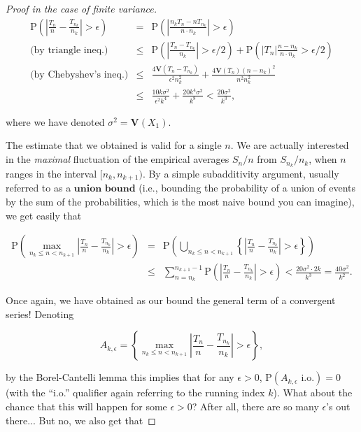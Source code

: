 \begin{proof}[Proof in the case of finite variance]
\begin{eqnarray*}
\mathrm{P}\left( \left| \frac{T_n}{n}-\frac{T_{n_k}}{n_k} \right| > \epsilon \right) &=& \mathrm{P}\left( \left|
\frac{n_k T_n - n T_{n_k}}{n\cdot n_k} \right|>\epsilon\right) \\
\textrm{(by triangle ineq.)}  &\le&
\mathrm{P}\left( \left| \frac{T_n -T_{n_k}}{n_k} \right| > \epsilon/2 \right)+ \mathrm{P}\left( \left|T_n\right| \frac{n-n_k}{n\cdot n_k}
> \epsilon/2 \right) \\
\textrm{(by Chebyshev's ineq.)} &\le&
\frac{4 \mathbf{V}(T_n-T_{n_k})}{\epsilon^2 n_k^2} + \frac{4\mathbf{V}(T_n)(n-n_k)^2}{n^2 n_k^2} \\
&\le&
\frac{10 k \sigma^2}{\epsilon^2 k^4} + \frac{20 k^4 \sigma^2}{k^8} < \frac{20 \sigma^2}{k^3},
\end{eqnarray*}

\noindent where we have denoted $\sigma^2=\mathbf{V}(X_1)$.

The estimate that we obtained is valid for a single
$n$. We are actually interested in the \emph{maximal}
fluctuation of the empirical averages $S_n/n$ from
$S_{n_k}/n_k$, when $n$ ranges in the interval
$[n_k,n_{k+1})$. By a simple subadditivity argument,
usually referred to as a $\textbf{union bound}$
(i.e., bounding the probability of a union of events
by the sum of the probabilities, which is the most
naive bound you can imagine), we get easily that

\begin{eqnarray*}
\mathrm{P}\left(\max_{n_k \le n < n_{k+1}} \left| \frac{T_n}{n} - \frac{T_{n_k}}{n_k} \right| > \epsilon \right)
&=&
\mathrm{P}\left(\bigcup_{n_k \le n < n_{k+1}} \left\{\left| \frac{T_n}{n} - \frac{T_{n_k}}{n_k} \right| > \epsilon \right\}\right) \\
&\le& \sum_{n=n_k}^{n_{k+1}-1}
\mathrm{P}\left(\left| \frac{T_n}{n} - \frac{T_{n_k}}{n_k} \right| > \epsilon \right) < \frac{20 \sigma^2\cdot 2k}{k^3}
= \frac{40\sigma^2}{k^2}.
\end{eqnarray*}

\noindent Once again, we have obtained as our bound the general
term of a convergent series! Denoting

\[
A_{k,\epsilon} = \left\{ \max_{n_k \le n < n_{k+1}} \left| \frac{T_n}{n} - \frac{T_{n_k}}{n_k} \right| > \epsilon
\right\},
\]

\noindent by the Borel-Cantelli lemma this implies that for any
$\epsilon>0$,
$\mathrm{P}(A_{k,\epsilon}\textrm{ i.o.})=0$ (with
the ``i.o.'' qualifier again referring to the running
index $k$). What about the chance that this will
happen for some $\epsilon>0$? After all, there are so
many $\epsilon$'s out there... But no, we also get
that


\end{proof}
